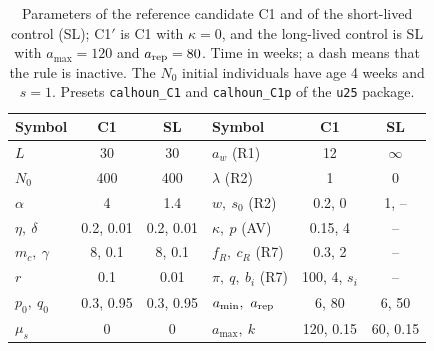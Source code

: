 \begin{table}[t]
  \caption{Parameters of the reference candidate \textsf{C1} and of the short-lived control (SL); \textsf{C1$'$}
  is \textsf{C1} with $\kappa=0$, and the long-lived control is SL with $a_{\max}=120$ and $a_{\rm rep}=80$. Time in weeks; a dash means that the rule is inactive. The $N_0$ initial individuals
  have age 4 weeks and $s=1$. Presets \texttt{calhoun\_C1} and \texttt{calhoun\_C1p} of the \texttt{u25} package.}
  \label{tab:params}
  \begin{ruledtabular}
  \begin{tabular}{lcclcc}
    Symbol & \textsf{C1} & SL & Symbol & \textsf{C1} & SL \\
    \hline
    $L$ & 30 & 30 & $a_w$ (R1) & 12 & $\infty$ \\
    $N_0$ & 400 & 400 & $\lambda$ (R2) & 1 & 0 \\
    $\alpha$ & 4 & 1.4 & $w,\ s_0$ (R2) & 0.2, 0 & 1, -- \\
    $\eta,\ \delta$ & 0.2, 0.01 & 0.2, 0.01 & $\kappa,\ p$ (AV) & 0.15, 4 & -- \\
    $m_c,\ \gamma$ & 8, 0.1 & 8, 0.1 & $f_R,\ c_R$ (R7) & 0.3, 2 & -- \\
    $r$ & 0.1 & 0.01 & $\pi,\ q,\ b_i$ (R7) & 100, 4, $s_i$ & -- \\
    $p_0,\ q_0$ & 0.3, 0.95 & 0.3, 0.95 & $a_{\min},\ a_{\rm rep}$ & 6, 80 & 6, 50 \\
    $\mu_s$ & 0 & 0 & $a_{\max},\ k$ & 120, 0.15 & 60, 0.15 \\
  \end{tabular}
  \end{ruledtabular}
\end{table}
